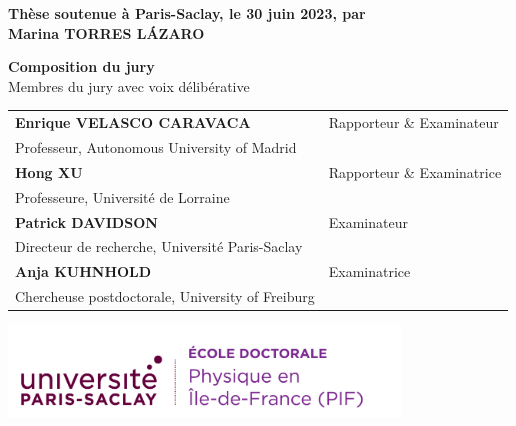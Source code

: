 \documentclass[french,12pt,a4paper]{book}
\begin{document}
\begin{titlepage}
\textbf{Thèse soutenue à Paris-Saclay, le 30 juin 2023, par}\\
\bigskip
\Large {\color{Prune} \textbf{Marina TORRES LÁZARO}} %

\vspace{\fill} %

\bigskip

\flushleft
\small {\color{Prune} \textbf{Composition du jury}}\\
{\color{Prune} \scriptsize {Membres du jury avec voix délibérative}} \\
\vspace{2mm}
\scriptsize
\begin{tabular}{|p{7cm}l}
\arrayrulecolor{Prune}
\textbf{Enrique VELASCO CARAVACA} &  Rapporteur \& Examinateur \\
Professeur, Autonomous University of Madrid  &   \\
\textbf{Hong XU} &  Rapporteur \& Examinatrice \\
Professeure, Université de Lorraine   &   \\
\textbf{Patrick DAVIDSON} &  Examinateur \\
Directeur de recherche, Université Paris-Saclay   &   \\
\textbf{Anja KUHNHOLD} &  Examinatrice \\
Chercheuse postdoctorale, University of Freiburg   &   \\
 

\end{tabular} 

\end{titlepage}


\thispagestyle{empty}
\selectfont

\lhead{}
\rhead{}
\rfoot{}
\cfoot{}
\lfoot{}

\noindent 
\includegraphics[height=2.45cm]{logo_usp_PIF.png}
\vspace{1cm}
\selectfont
\end{document}
